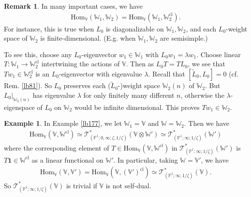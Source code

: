 \documentclass[11pt,b5paper,notitlepage]{article}
\theoremstyle{definition}
\newtheorem{eg}[df]{Example}
\newtheorem{rem}[df]{Remark}
\theoremstyle{plain}
\newcommand{\wtd}{\widetilde}
\newcommand{\id}{\mathbf{1}}
\newcommand{\Hom}{\mathrm{Hom}}
\newcommand{\scr}{\mathscr}
\newcommand{\Vbb}{\mathbb V}
\newcommand{\Wbb}{\mathbb W}
\newcommand{\Pbb}{\mathbb P}
\newcommand{\cl}{\mathrm{cl}}
\numberwithin{equation}{section}
\begin{document}
\begin{rem}
In many important cases, we have
\begin{align}
\Hom_\Vbb(\Wbb_1,\Wbb_2)=\Hom_\Vbb(\Wbb_1,\Wbb_2^\cl).
\end{align}
For instance, this is true when $L_0$ is diagonalizable on $\Wbb_1,\Wbb_2$, and each $L_0$-weight space of $\Wbb_2$ is finite-dimensional. (E.g. when $\Wbb_1,\Wbb_2$ are semisimple.) 

To see this, choose any $L_0$-eigenvector $w_1\in\Wbb_1$ with $L_0w_1=\lambda w_1$. Choose linear $T:\Wbb_1\rightarrow\Wbb_2^\cl$ intertwining the actions of $\Vbb$. Then as $L_0T=TL_0$, we see that $Tw_1\in\Wbb_2^\cl$ is an $L_0$-eigenvector with eigenvalue $\lambda$. Recall that $[\wtd L_0,L_0]=0$ (cf. Rem. \ref{lb81}). So $L_0$ preserves each ($\wtd L_0$-)weight space $\Wbb_2(n)$ of $\Wbb_2$. But $L_0|_{\Wbb_2(n)}$ has eigenvalue $\lambda$ for only finitely many different $n$, otherwise the $\lambda$-eigenspace of $L_0$ on $\Wbb_2$ would be infinite dimensional. This proves  $Tw_1\in\Wbb_2$.  \hfill\qedsymbol
\end{rem}







\begin{eg}\label{lb189}
In Example \ref{lb177}, we let $\Wbb_1=\Vbb$ and $\Wbb=\Wbb_2$. Then we have
\begin{align}
\Hom_\Vbb(\Vbb,\Wbb^\cl)\simeq\scr T_{(\Pbb^1;0,\infty;\zeta,1/\zeta)}^*(\Vbb\otimes\Wbb')\simeq\scr T_{(\Pbb^1;\infty;1/\zeta)}^*(\Wbb')
\end{align}
where the corresponding element of $T\in\Hom_\Vbb(\Vbb,\Wbb^\cl)$ in $\scr T_{(\Pbb^1;\infty;1/\zeta)}^*(\Wbb')$ is  $T\id\in\Wbb^\cl$ as a linear functional on $\Wbb'$. In particular, taking $\Wbb=\Vbb'$, we have
\begin{align}\label{eq256}
\Hom_\Vbb(\Vbb,\Vbb')=\Hom_\Vbb(\Vbb,(\Vbb')^\cl)\simeq \scr T_{(\Pbb^1;\infty;1/\zeta)}^*(\Vbb).
\end{align}
So $\scr T_{(\Pbb^1;\infty;1/\zeta)}^*(\Vbb)$ is trivial if $\Vbb$ is not self-dual.
\end{eg}







\subsection{}
\end{document}
